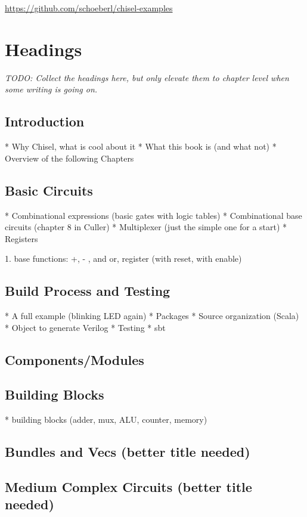 \documentclass[%
    10pt, %
    headinclude, footexclude,
    openright, %
    notitlepage,
    cleardoubleempty,
    headsepline,
    pointlessnumbers,
    bibtotoc, idxtotoc,
    ]{scrbook}
\newcommand{\todo}[1]{{\emph{TODO: #1}}}
\begin{document}
\url{https://github.com/schoeberl/chisel-examples}

\chapter{Headings}

\todo{Collect the headings here, but only elevate them to chapter level when some
writing is going on.}

\section{Introduction}

 * Why Chisel, what is cool about it
 * What this book is (and what not)
 * Overview of the following Chapters

\section{Basic Circuits}

 * Combinational expressions (basic gates with logic tables)
 * Combinational base circuits (chapter 8 in Culler)
 * Multiplexer (just the simple one for a start)
 * Registers

1. base functions: +, - , and or, register (with reset, with enable)


\section{Build Process and Testing}

 * A full example (blinking LED again)
 * Packages
 * Source organization (Scala)
 * Object to generate Verilog
 * Testing
 * sbt

\section{Components/Modules}

\section{Building Blocks}

 * building blocks (adder, mux, ALU, counter, memory)

\section{Bundles and Vecs (better title needed)}

\section{Medium Complex Circuits (better title needed)}
\end{document}
